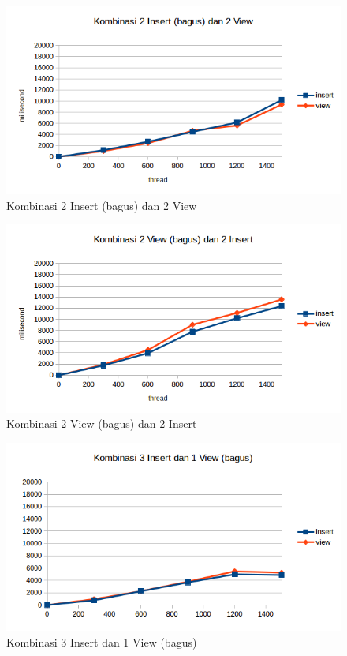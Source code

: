 \documentclass{ta-its}
\begin{document}
		\begin{figure}[h] %
			\centering
			\includegraphics[width=0.85\linewidth]{contoh_img/hasil/2-2-ibagus}
			\caption{Kombinasi 2 Insert (bagus) dan 2 View}
			\label{gambar2-2ibagus}
		\end{figure}
		
		\begin{figure}[h] %
			\centering
			\includegraphics[width=0.85\linewidth]{contoh_img/hasil/2-2-vbagus}
			\caption{Kombinasi 2 View (bagus) dan 2 Insert}
			\label{gambar2-2vbagus}
		\end{figure}
		
		\begin{figure}[h] %
			\centering
			\includegraphics[width=0.85\linewidth]{contoh_img/hasil/3-1-bagus}
			\caption{Kombinasi 3 Insert dan 1 View (bagus)}
			\label{gambar3-1bagus}
		\end{figure}
		
\end{document}
